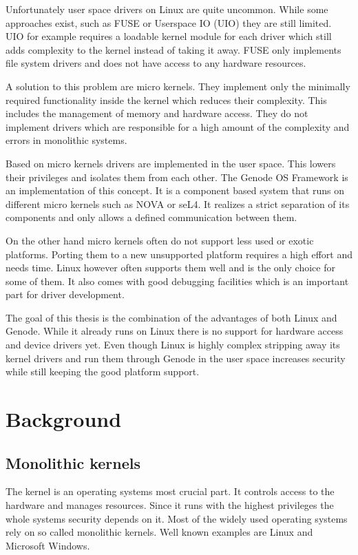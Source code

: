 \documentclass[
a4paper,
12pt,
notitlepage,
parskip=half,
DIV=11,
]{scrbook}
\begin{document}
		Unfortunately user space drivers on Linux are quite uncommon.
		While some approaches exist, such as FUSE \citep{fuse} or Userspace IO (UIO) \citep{uio} they are still limited.
		UIO for example requires a loadable kernel module for each driver which still adds complexity to the kernel instead of taking it away.
		FUSE only implements file system drivers and does not have access to any hardware resources.
		
		A solution to this problem are micro kernels.
		They implement only the minimally required functionality inside the kernel which reduces their complexity.
		This includes the management of memory and hardware access.
		They do not implement drivers which are responsible for a high amount of the complexity and errors in monolithic systems. \citep{Chou:SOSP:01}
		
		Based on micro kernels drivers are implemented in the user space.
		This lowers their privileges and isolates them from each other.
		The Genode OS Framework is an implementation of this concept. 
		It is a component based system that runs on different micro kernels such as NOVA or seL4.
		It realizes a strict separation of its components and only allows a defined communication between them.
		
		On the other hand micro kernels often do not support less used or exotic platforms.
		Porting them to a new unsupported platform requires a high effort and needs time.
		Linux however often supports them well and is the only choice for some of them.
		It also comes with good debugging facilities which is an important part for driver development.
		
		The goal of this thesis is the combination of the advantages of both Linux and Genode.
		While it already runs on Linux there is no support for hardware access and device drivers yet.
		Even though Linux is highly complex stripping away its kernel drivers and run them through Genode in the user space increases security while still keeping the good platform support.
		
	\chapter{Background}

		\section{Monolithic kernels}
		
		The kernel is an operating systems most crucial part.
		It controls access to the hardware and manages resources.
		Since it runs with the highest privileges the whole systems security depends on it.
		Most of the widely used operating systems rely on so called monolithic kernels.
		Well known examples are Linux and Microsoft Windows.
		
\end{document}
